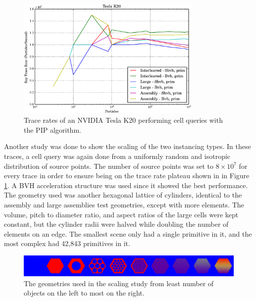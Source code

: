 \begin{figure}[h!] 
  \centering
    \includegraphics[width=0.8\textwidth]{graphics/prelim_optix_k20.eps}
     \caption{Trace rates of an NVIDIA Tesla K20 performing cell queries with the PIP algorithm. \label{prelim_optix_k20} }
\end{figure}%

Another study was done to show the scaling of the two instancing types.  In these traces, a cell query was again done from a uniformly random and isotropic distribution of source points.  The number of source points was set to $8\times10^7$ for every trace in order to ensure being on the trace rate plateau shown in in Figure \ref{prelim_optix_k20}.  A BVH acceleration structure was used since it showed the best performance.  The geometry used was another hexagonal lattice of cylinders, identical to the assembly and large assemblies test geometries, except with more elements.  The volume, pitch to diameter ratio, and aspect ratios of the large cells were kept constant, but the cylinder radii were halved while doubling the number of elements on an edge.  The smallest scene only had a single primitive in it, and the most complex had 42,843 primitives in it.  

\begin{figure}[h!] 
  \centering
    \includegraphics[width=1.0\textwidth]{graphics/prelim/prelim_scaling_geom.png}
     \caption{The geometries used in the scaling study from least number of objects on the left to most on the right. \label{prelim_scaling_geom} }
\end{figure}

